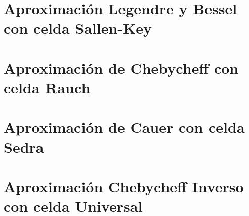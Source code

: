 







\tableofcontents
\newpage

\section{Aproximación Legendre y Bessel con celda Sallen-Key}
	

\section{Aproximación de Chebycheff con celda Rauch}
		
	
\section{Aproximación de Cauer con celda Sedra}
		
	
\section{Aproximación Chebycheff Inverso con celda Universal}
		

